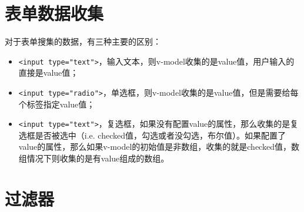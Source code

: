 \section{表单数据收集}
对于表单搜集的数据，有三种主要的区别：
\begin{itemize}
\item \verb|<input type="text">|，输入文本，则v-model收集的是value值，用户输入的直接是value值；
\item \verb|<input type="radio">|，单选框，则v-model收集的是value值，但是需要给每个标签指定value值；
\item \verb|<input type="text">|，复选框，如果没有配置value的属性，那么收集的是复选框是否被选中（i.e. checked值，勾选或者没勾选，布尔值）。如果配置了value的属性，那么如果v-model的初始值是非数组，收集的就是checked值，数组情况下则收集的是有value组成的数组。
\end{itemize}

\section{过滤器}